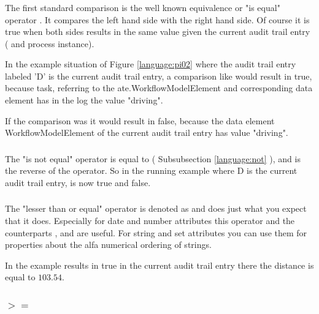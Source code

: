 \subsubsection{\ltl{==}}

The first standard comparison is the well known equivalence or "is equal"
operator \ltl{==}. It compares the left hand side with the right hand side. Of
course it is true when both sides results in the same value given the current
audit trail entry ( and process instance). 

In the example situation of Figure
\ref{language:pi02} where the audit trail entry labeled 'D' is the current
audit trail entry, a comparison like  would result in
true, because task, referring to the ate.WorkflowModelElement and
corresponding data element has in the log the value "driving". 

If the comparison was  it would result in false,
because the data element WorkflowModelElement of the current audit trail entry
has value "driving".

\subsubsection{\ltl{!=}}

The "is not equal" operator  is equal to  (
Subsubsection \ref{language:not} ), and is the
reverse of the \ltl{==} operator. So in the running example where D is the
current audit trail entry,  is now true and  false.

\subsubsection{\ltl{$<=$}}

The "lesser than or equal" operator is denoted as \ltl{$<=$} and does just what you
expect that it does. Especially for date and number attributes this operator
and the counterparts \ltl{$>=$}, \ltl{$<$} and \ltl{$>$} are useful. For
string and set attributes you can use them for properties about the
alfa numerical ordering of strings. 

In the example  results in true in the current audit
trail entry there the distance is equal to $103.54$.

\subsubsection{$>=$}

